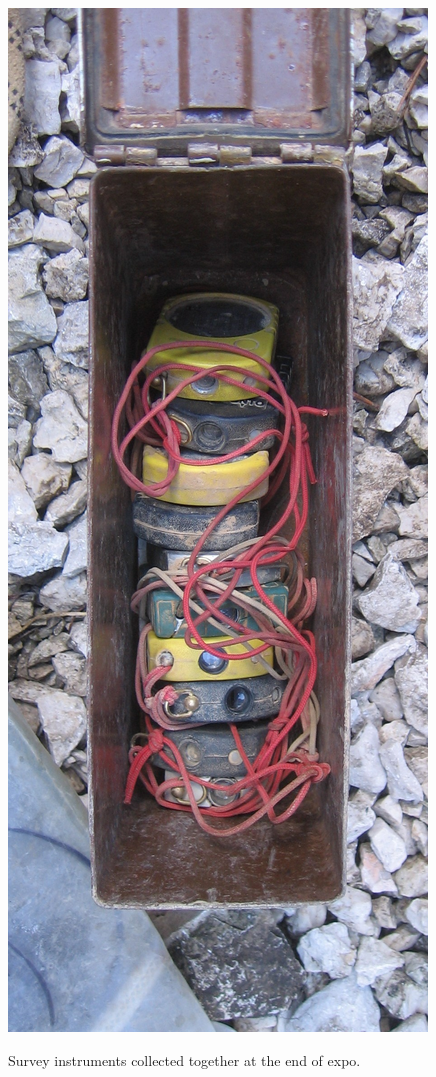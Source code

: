 \begin{marginfigure}
\checkoddpage \ifoddpage \forcerectofloat \else \forceversofloat \fi
   \centering
\includegraphics[width = \textwidth]{2010/expo_findings/20100811-12-17-38 - Jarvist Frost A520 - IMG_0041 - survey instruments.jpg}
\caption{Survey instruments collected together at the end of expo. } \label{ammo tin instruments}
\end{marginfigure}

